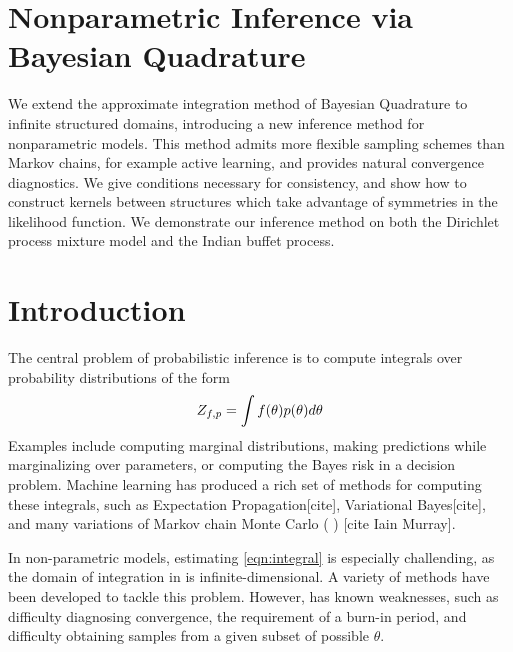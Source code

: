 \section{Nonparametric Inference via Bayesian Quadrature}

We extend the approximate integration method of Bayesian Quadrature to infinite structured domains, introducing a new inference method for nonparametric models.%
This method admits more flexible sampling schemes than Markov chains, for example active learning, and provides natural convergence diagnostics.  We give conditions necessary for consistency, and show how to construct kernels between structures which take advantage of symmetries in the likelihood function.  We demonstrate our inference method on both the Dirichlet process mixture model and the Indian buffet process.



\section{Introduction}

The central problem of probabilistic inference is to compute integrals over probability distributions of the form
\begin{equation}
	Z_{f,p} = \int f(\theta) p(\theta) d\theta
	\label{eqn:integral}
\end{equation}
Examples include computing marginal distributions, making predictions while marginalizing over parameters, or computing the Bayes risk in a decision problem.  Machine learning has produced a rich set of methods for computing these integrals, such as Expectation Propagation[cite], Variational Bayes[cite], and many variations of Markov chain Monte Carlo (\mcmc{} ) [cite Iain Murray].  

In non-parametric models, estimating \eqref{eqn:integral} is especially challending, as the domain of integration in is infinite-dimensional.  A variety of \mcmc{} methods have been developed to tackle this problem.  However, \mcmc{} has known weaknesses, such as difficulty diagnosing convergence, the requirement of a burn-in period, and difficulty obtaining samples from a given subset of possible $\theta$.

%


